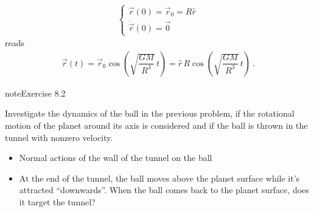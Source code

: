 \documentclass[letterpaper,10pt,english]{jupyterBook}
\begin{document}
\begin{equation*}
\begin{split}\begin{cases}
  \vec{r}(0) = \vec{r}_0 = R \hat{r} \\
  \dot{\vec{r}}(0) = \vec{0}
\end{cases}\end{split}
\end{equation*}
\sphinxAtStartPar
reads
\begin{equation*}
\begin{split}\vec{r}(t) = \vec{r}_0 \cos \left( \sqrt{\dfrac{GM}{R^3}} \, t \right) = \hat{r} \, R \cos \left( \sqrt{\dfrac{GM}{R^3}} \, t \right) \ .\end{split}
\end{equation*} \label{exercise:ch/exercises-gravitation-exercise-1}

\begin{sphinxadmonition}{note}{Exercise 8.2}



\sphinxAtStartPar
Investigate the dynamics of the ball in the previous problem, if the rotational motion of the planet around its axis is considered and if the ball is thrown in the tunnel with non\sphinxhyphen{}zero velocity.
\begin{itemize}
\item {} 
\sphinxAtStartPar
Normal actions of the wall of the tunnel on the ball

\item {} 
\sphinxAtStartPar
At the end of the tunnel, the ball moves above the planet surface while it’s attracted “downwards”. When the ball comes back to the planet surface, does it target the tunnel?

\end{itemize}
\end{sphinxadmonition}
\end{document}
